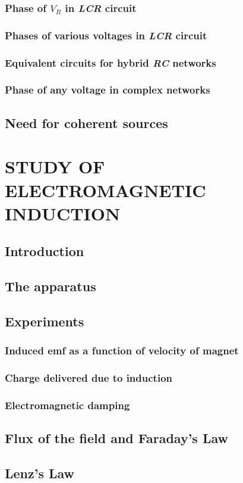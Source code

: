 \documentclass[12pt]{book}
\begin{document}
\subsection{Phase of $V_R$ in \textit{LCR} circuit}
\subsection{Phases of various voltages in \textit{LCR} circuit}
\subsection{Equivalent circuits for hybrid \textit{RC} networks}
\subsection{Phase of any voltage in complex networks}
\section{Need for coherent sources}

\chapter{STUDY OF ELECTROMAGNETIC INDUCTION}
\section{Introduction}
\section{The apparatus}
\section{Experiments}
\subsection{Induced emf as a function of velocity of magnet}
\subsection{Charge delivered due to induction}
\subsection{Electromagnetic damping}
\section{Flux of the field and Faraday's Law}
\section{Lenz's Law}

\end{document}
